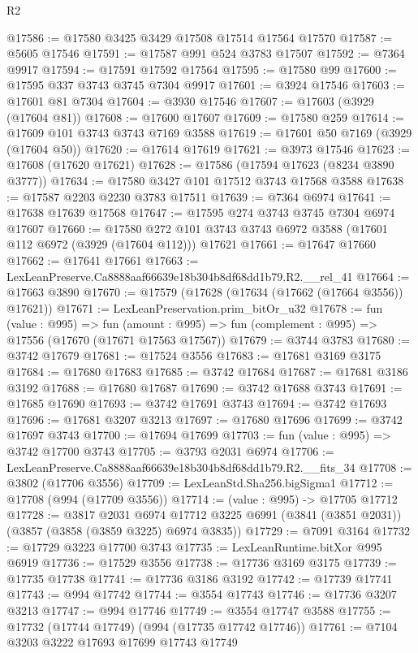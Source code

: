 \begin{lexlean}{R2}
\begin{coremodule}
@17586 := @17580 @3425 @3429 @17508 @17514 @17564 @17570
@17587 := @5605 @17546
@17591 := @17587 @991 @524 @3783 @17507
@17592 := @7364 @9917
@17594 := @17591 @17592 @17564
@17595 := @17580 @99
@17600 := @17595 @337 @3743 @3745 @7304 @9917
@17601 := @3924 @17546
@17603 := @17601 @81 @7304
@17604 := @3930 @17546
@17607 := @17603 (@3929 (@17604 @81))
@17608 := @17600 @17607
@17609 := @17580 @259
@17614 := @17609 @101 @3743 @3743 @7169 @3588
@17619 := @17601 @50 @7169 (@3929 (@17604 @50))
@17620 := @17614 @17619
@17621 := @3973 @17546
@17623 := @17608 (@17620 @17621)
@17628 := @17586 (@17594 @17623 (@8234 @3890 @3777))
@17634 := @17580 @3427 @101 @17512 @3743 @17568 @3588
@17638 := @17587 @2203 @2230 @3783 @17511
@17639 := @7364 @6974
@17641 := @17638 @17639 @17568
@17647 := @17595 @274 @3743 @3745 @7304 @6974 @17607
@17660 := @17580 @272 @101 @3743 @3743 @6972 @3588 (@17601 @112 @6972 (@3929 (@17604 @112))) @17621
@17661 := @17647 @17660
@17662 := @17641 @17661
@17663 := LexLeanPreserve.Ca8888aaf66639e18b304b8df68dd1b79.R2.__rel_41
@17664 := @17663 @3890
@17670 := @17579 (@17628 (@17634 (@17662 (@17664 @3556)) @17621))
@17671 := LexLeanPreservation.prim_bitOr_u32
@17678 := fun (value : @995) =>
  fun (amount : @995) => fun (complement : @995) => @17556 (@17670 (@17671 @17563 @17567))
@17679 := @3744 @3783
@17680 := @3742 @17679
@17681 := @17524 @3556
@17683 := @17681 @3169 @3175
@17684 := @17680 @17683
@17685 := @3742 @17684
@17687 := @17681 @3186 @3192
@17688 := @17680 @17687
@17690 := @3742 @17688 @3743
@17691 := @17685 @17690
@17693 := @3742 @17691 @3743
@17694 := @3742 @17693
@17696 := @17681 @3207 @3213
@17697 := @17680 @17696
@17699 := @3742 @17697 @3743
@17700 := @17694 @17699
@17703 := fun (value : @995) => @3742 @17700 @3743
@17705 := @3793 @2031 @6974
@17706 := LexLeanPreserve.Ca8888aaf66639e18b304b8df68dd1b79.R2.__fits_34
@17708 := @3802 (@17706 @3556)
@17709 := LexLeanStd.Sha256.bigSigma1
@17712 := @17708 (@994 (@17709 @3556))
@17714 := (value : @995) -> @17705 @17712
@17728 := @3817
    @2031
    @6974
    @17712
    @3225
    @6991
    (@3841 (@3851 @2031))
    (@3857 (@3858 (@3859 @3225) @6974 @3835))
@17729 := @7091 @3164
@17732 := @17729 @3223 @17700 @3743
@17735 := LexLeanRuntime.bitXor @995 @6919
@17736 := @17529 @3556
@17738 := @17736 @3169 @3175
@17739 := @17735 @17738
@17741 := @17736 @3186 @3192
@17742 := @17739 @17741
@17743 := @994 @17742
@17744 := @3554 @17743
@17746 := @17736 @3207 @3213
@17747 := @994 @17746
@17749 := @3554 @17747 @3588
@17755 := @17732 (@17744 @17749) (@994 (@17735 @17742 @17746))
@17761 := @7104 @3203 @3222 @17693 @17699 @17743 @17749

\end{coremodule}
\end{lexlean}
